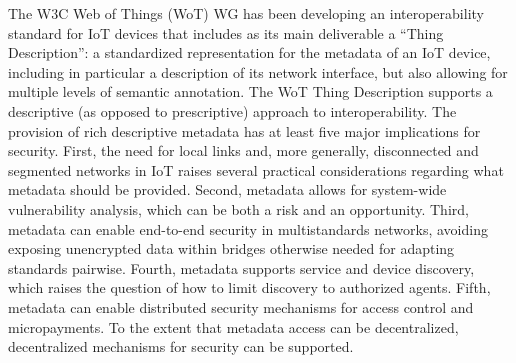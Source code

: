 The W3C Web of Things (WoT) WG has been developing an interoperability standard for IoT devices that includes as
its main deliverable a ``Thing Description'': a standardized representation for the metadata of an 
IoT device, including in particular a description of its network interface,
but also allowing for multiple levels of semantic annotation.
The WoT Thing Description supports a descriptive (as opposed to prescriptive) approach to interoperability.
The provision of rich descriptive metadata has at least five major implications for security.
First, the need for local links and, more generally, disconnected and segmented networks
       in IoT raises several practical considerations regarding what metadata should be provided.
Second, metadata allows for system-wide vulnerability analysis, 
       which can be both a risk and an opportunity.
Third, metadata can enable end-to-end security in multistandards networks,
       avoiding exposing unencrypted data within bridges otherwise needed for adapting standards pairwise.
Fourth, metadata supports service and device discovery,
       which raises the question of how to limit discovery to authorized agents.
Fifth, metadata can enable distributed security mechanisms for access control and micropayments.
       To the extent that metadata access can be decentralized, decentralized mechanisms for security can
       be supported.
